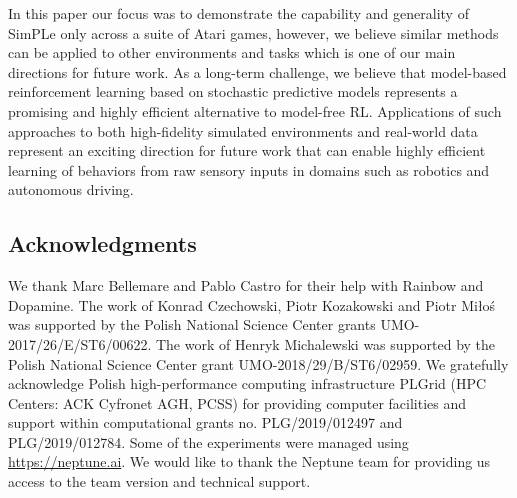 In this paper our focus was to demonstrate the capability and generality of SimPLe only across a suite of Atari games, however, we believe similar methods can be applied to other environments and tasks which is one of our main directions for future work. As a long-term challenge, we believe that model-based reinforcement learning based on stochastic predictive models represents a promising and highly efficient alternative to model-free RL. Applications of such approaches to both high-fidelity simulated environments and real-world data represent an exciting direction for future work that can enable highly efficient learning of behaviors from raw sensory inputs in domains such as robotics and autonomous driving.

\subsection*{Acknowledgments} We thank Marc Bellemare and Pablo Castro for their help with Rainbow and Dopamine. The work of Konrad Czechowski, Piotr Kozakowski and Piotr Miłoś was supported by the Polish National Science Center grants UMO-2017/26/E/ST6/00622. The work of Henryk Michalewski was supported by the Polish National Science Center grant UMO-2018/29/B/ST6/02959. We gratefully acknowledge Polish high-performance computing infrastructure PLGrid (HPC Centers: ACK Cyfronet AGH, PCSS) for providing computer facilities and support within computational grants no. PLG/2019/012497 and PLG/2019/012784. Some of the experiments were managed using \url{https://neptune.ai}. We would like to thank the Neptune team for providing us access to the team version and technical support.